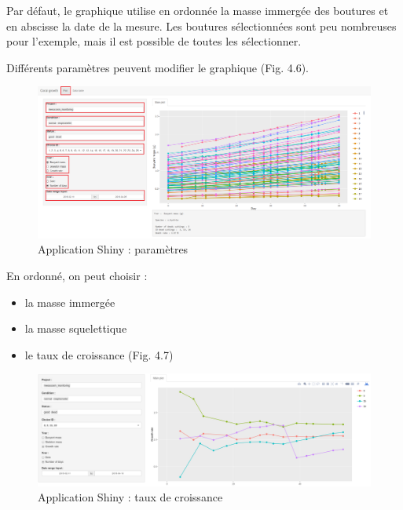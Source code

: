 \documentclass[]{report}
\providecommand{\tightlist}{%
  \setlength{\itemsep}{0pt}\setlength{\parskip}{0pt}}
\begin{document}
\vspace{0.5 cm}

Par défaut, le graphique utilise en ordonnée la masse immergée des
boutures et en abscisse la date de la mesure. Les boutures sélectionnées
sont peu nombreuses pour l'exemple, mais il est possible de toutes les
sélectionner.

\vspace{0.5 cm}

Différents paramètres peuvent modifier le graphique (Fig. 4.6).

\begin{figure}
\centering
\includegraphics[width=15.00000cm]{../image/notebook-plot2.PNG}
\caption{Application Shiny : paramètres}
\end{figure}

\vspace{0.5cm}

\null
\newpage

En ordonné, on peut choisir :

\begin{itemize}
\tightlist
\item
  la masse immergée
\item
  la masse squelettique
\item
  le taux de croissance (Fig. 4.7) 
\end{itemize}

\begin{figure}[h!]
\includegraphics[]{../image/taux-croissance.PNG}
\caption{Application Shiny : taux de croissance}
\end{figure}
\end{document}
